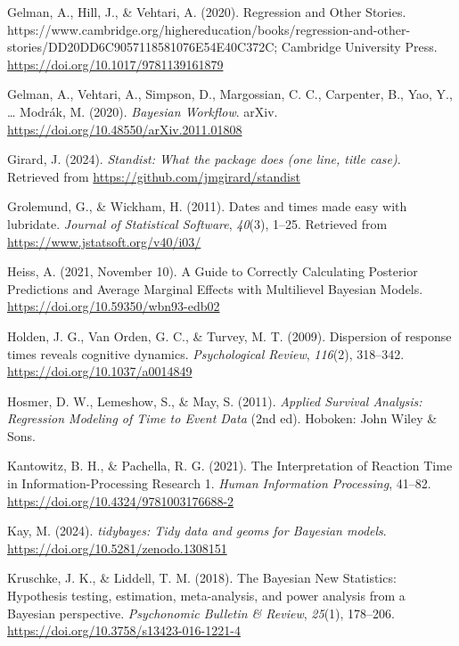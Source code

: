 \documentclass[
  man, donotrepeattitle,floatsintext]{apa6}
\newlength{\cslhangindent}
\newenvironment{CSLReferences}[2] %
 {\begin{list}{}{%
  \setlength{\itemindent}{0pt}
  \setlength{\leftmargin}{0pt}
  \setlength{\parsep}{0pt}
  \ifodd #1
   \setlength{\leftmargin}{\cslhangindent}
   \setlength{\itemindent}{-1\cslhangindent}
  \fi
  \setlength{\itemsep}{#2\baselineskip}}}
 {\end{list}}
\begin{document}
\begin{CSLReferences}{1}{0}
Gelman, A., Hill, J., \& Vehtari, A. (2020). Regression and {Other Stories}. https://www.cambridge.org/highereducation/books/regression-and-other-stories/DD20DD6C9057118581076E54E40C372C; Cambridge University Press. \url{https://doi.org/10.1017/9781139161879}

Gelman, A., Vehtari, A., Simpson, D., Margossian, C. C., Carpenter, B., Yao, Y., \ldots{} Modrák, M. (2020). \emph{Bayesian {Workflow}}. arXiv. \url{https://doi.org/10.48550/arXiv.2011.01808}

Girard, J. (2024). \emph{Standist: What the package does (one line, title case)}. Retrieved from \url{https://github.com/jmgirard/standist}

Grolemund, G., \& Wickham, H. (2011). Dates and times made easy with {lubridate}. \emph{Journal of Statistical Software}, \emph{40}(3), 1--25. Retrieved from \url{https://www.jstatsoft.org/v40/i03/}

Heiss, A. (2021, November 10). A Guide to Correctly Calculating Posterior Predictions and Average Marginal Effects with Multilievel {Bayesian} Models. \url{https://doi.org/10.59350/wbn93-edb02}

Holden, J. G., Van Orden, G. C., \& Turvey, M. T. (2009). Dispersion of response times reveals cognitive dynamics. \emph{Psychological Review}, \emph{116}(2), 318--342. \url{https://doi.org/10.1037/a0014849}

Hosmer, D. W., Lemeshow, S., \& May, S. (2011). \emph{Applied {Survival Analysis}: {Regression Modeling} of {Time} to {Event Data}} (2nd ed). Hoboken: John Wiley \& Sons.

Kantowitz, B. H., \& Pachella, R. G. (2021). The {Interpretation} of {Reaction Time} in {Information-Processing Research} 1. \emph{Human Information Processing}, 41--82. \url{https://doi.org/10.4324/9781003176688-2}

Kay, M. (2024). \emph{{tidybayes}: Tidy data and geoms for {Bayesian} models}. \url{https://doi.org/10.5281/zenodo.1308151}

Kruschke, J. K., \& Liddell, T. M. (2018). The {Bayesian New Statistics}: {Hypothesis} testing, estimation, meta-analysis, and power analysis from a {Bayesian} perspective. \emph{Psychonomic Bulletin \& Review}, \emph{25}(1), 178--206. \url{https://doi.org/10.3758/s13423-016-1221-4}


\end{CSLReferences}
\end{document}
